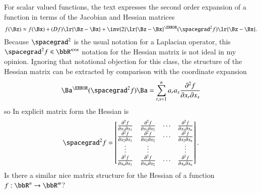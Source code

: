 For scalar valued functions, the text expresses the second order expansion of a function in terms of the Jacobian and Hessian matrices
%
\begin{equation}\label{eqn:jacobianAndHessian:380}
f(\Bz)
\approx f(\Bx) + (D f) \lr{ \Bz - \Bx }
+ \inv{2} \lr{ \Bz - \Bx }^\T (\spacegrad^2 f) \lr{ \Bz - \Bx }.
\end{equation}
%
Because \( \spacegrad^2 \) is the usual notation for a Laplacian operator, this \( \spacegrad^2 f \in \bbR^{n \times n}\) notation for the Hessian matrix is not ideal in my opinion.  Ignoring that notational objection for this class, the structure of the Hessian matrix can be extracted by comparison with the coordinate expansion
%
\begin{equation}\label{eqn:jacobianAndHessian:300}
\Ba^\T (\spacegrad^2 f) \Ba
=
\sum_{r,s = 1}^n a_r a_s \frac{\partial^2 f}{\partial x_r \partial x_s}
\end{equation}
%
so
%
In explicit matrix form the Hessian is
%
\begin{equation}\label{eqn:jacobianAndHessian:340}
\spacegrad^2 f
=
\begin{bmatrix}
\frac{\partial^2 f}{\partial x_1 \partial x_1} & \frac{\partial^2 f}{\partial x_1 \partial x_2} & \cdots &\frac{\partial^2 f}{\partial x_1 \partial x_n} \\
\frac{\partial^2 f}{\partial x_2 \partial x_1} & \frac{\partial^2 f}{\partial x_2 \partial x_2} & \cdots &\frac{\partial^2 f}{\partial x_2 \partial x_n} \\
\vdots & \vdots & & \vdots \\
\frac{\partial^2 f}{\partial x_n \partial x_1} & \frac{\partial^2 f}{\partial x_n \partial x_2} & \cdots &\frac{\partial^2 f}{\partial x_n \partial x_n}
\end{bmatrix}.
\end{equation}
%
Is there a similar nice matrix structure for the Hessian of a function \( f : \bbR^n \rightarrow \bbR^m \)?

